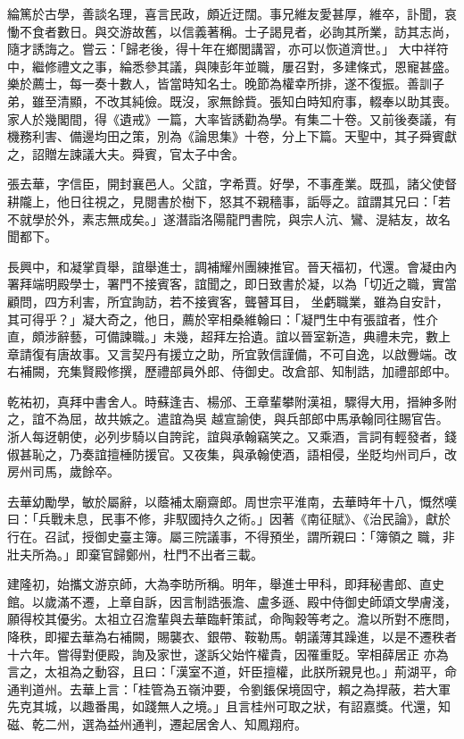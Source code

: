 \begin{pinyinscope}
 綸篤於古學，善談名理，喜言民政，頗近迂闊。事兄維友愛甚厚，維卒，訃聞，哀慟不食者數日。與交游故舊，以信義著稱。士子謁見者，必詢其所業，訪其志尚，隨才誘誨之。嘗云：「歸老後，得十年在鄉閭講習，亦可以恢道濟世。」
 大中祥符中，繼修禮文之事，綸悉參其議，與陳彭年並職，屢召對，多建條式，恩寵甚盛。樂於薦士，每一奏十數人，皆當時知名士。晚節為權幸所排，遂不復振。善訓子弟，雖至清顯，不改其純儉。既沒，家無餘貲。張知白時知府事，輟奉以助其喪。家人於幾閣間，得《遺戒》一篇，大率皆誘勸為學。有集二十卷。又前後奏議，有機務利害、備邊均田之策，別為《論思集》十卷，分上下篇。天聖中，其子舜賓獻之，詔贈左諫議大夫。舜賓，官太子中舍。



 張去華，字信臣，開封襄邑人。父誼，字希賈。好學，不事產業。既孤，諸父使督耕隴上，他日往視之，見閱書於樹下，怒其不親穡事，詬辱之。誼謂其兄曰：「若不就學於外，素志無成矣。」遂潛詣洛陽龍門書院，與宗人沆、鸞、湜結友，故名聞都下。



 長興中，和凝掌貢舉，誼舉進士，調補耀州團練推官。晉天福初，代還。會凝由內署拜端明殿學士，署門不接賓客，誼聞之，即日致書於凝，以為「切近之職，實當顧問，四方利害，所宜詢訪，若不接賓客，聾瞽耳目，
 坐虧職業，雖為自安計，其可得乎？」凝大奇之，他日，薦於宰相桑維翰曰：「凝門生中有張誼者，性介直，頗涉辭藝，可備諫職。」未幾，超拜左拾遺。誼以晉室新造，典禮未完，數上章請復有唐故事。又言契丹有援立之助，所宜敦信謹備，不可自逸，以啟釁端。改右補闕，充集賢殿修撰，歷禮部員外郎、侍御史。改倉部、知制誥，加禮部郎中。



 乾祐初，真拜中書舍人。時蘇逢吉、楊邠、王章輩攀附漢祖，驟得大用，搢紳多附之，誼不為屈，故共嫉之。遣誼為吳
 越宣諭使，與兵部郎中馬承翰同往賜官告。浙人每迓朝使，必列步騎以自誇詫，誼與承翰竊笑之。又乘酒，言詞有輕發者，錢俶甚恥之，乃奏誼擅棰防援官。又夜集，與承翰使酒，語相侵，坐貶均州司戶，改房州司馬，歲餘卒。



 去華幼勵學，敏於屬辭，以蔭補太廟齋郎。周世宗平淮南，去華時年十八，慨然嘆曰：「兵戰未息，民事不修，非馭國持久之術。」因著《南征賦》、《治民論》，獻於行在。召試，授御史臺主簿。屬三院議事，不得預坐，謂所親曰：「簿領之
 職，非壯夫所為。」即棄官歸鄭州，杜門不出者三載。



 建隆初，始攜文游京師，大為李昉所稱。明年，舉進士甲科，即拜秘書郎、直史館。以歲滿不遷，上章自訴，因言制誥張澹、盧多遜、殿中侍御史師頌文學膚淺，願得校其優劣。太祖立召澹輩與去華臨軒策試，命陶穀等考之。澹以所對不應問，降秩，即擢去華為右補闕，賜襲衣、銀帶、鞍勒馬。朝議薄其躁進，以是不遷秩者十六年。嘗得對便殿，詢及家世，遂訴父始忤權貴，因罹重貶。宰相薛居正
 亦為言之，太祖為之動容，且曰：「漢室不道，奸臣擅權，此朕所親見也。」荊湖平，命通判道州。去華上言：「桂管為五嶺沖要，令劉鋹保境固守，賴之為捍蔽，若大軍先克其城，以趣番禺，如踐無人之境。」且言桂州可取之狀，有詔嘉獎。代還，知磁、乾二州，選為益州通判，遷起居舍人、知鳳翔府。




\end{pinyinscope}
